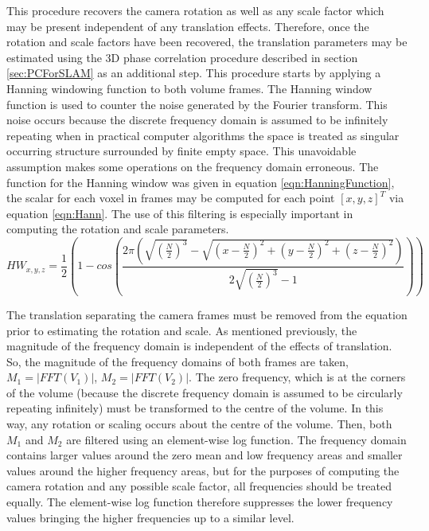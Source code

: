 This procedure recovers the camera rotation as well as any scale factor which may be present independent of any translation effects. Therefore, once the rotation and scale factors have been recovered, the translation parameters may be estimated using the 3D phase correlation procedure described in section \ref{sec:PCForSLAM} as an additional step. This procedure starts by applying a Hanning windowing function to both volume frames. The Hanning window function is used to counter the noise generated by the Fourier transform. This noise occurs because the discrete frequency domain is assumed to be infinitely repeating when in practical computer algorithms the space is treated as singular occurring structure surrounded by finite empty space. This unavoidable assumption makes some operations on the frequency domain erroneous. The function for the Hanning window was given in equation \ref{eqn:HanningFunction}, the scalar for each voxel in frames may be computed for each point $[x,y,z]^T$ via equation \ref{eqn:Hann}. The use of this filtering is especially important in computing the rotation and scale parameters. \\


\begin{equation} \label{eqn:Hann}
\scriptstyle
HW_{x,y,z} = \frac{1}{2}\left(
1 - cos \left(
\frac{2\pi
\left(
\sqrt{\left(\frac{N}{2}\right)^3} -
\sqrt{
\left(x-\frac{N}{2}\right)^2 + \left(y-\frac{N}{2}\right)^2 + \left(z-\frac{N}{2}\right)^2
}
\right)
}
{2\sqrt{\left(\frac{N}{2}\right)^3} - 1}
\right)
\right)
\end{equation}

The translation separating the camera frames must be removed from the equation prior to estimating the rotation and scale. As mentioned previously, the magnitude of the frequency domain is independent of the effects of translation. So, the magnitude of the frequency domains of both frames are taken, $M_1 = |FFT(V_1)|$, $M_2 = |FFT(V_2)|$. The zero frequency, which is at the corners of the volume (because the discrete frequency domain is assumed to be circularly repeating infinitely) must be transformed to the centre of the volume. In this way, any rotation or scaling occurs about the centre of the volume. Then, both $M_1$ and $M_2$ are filtered using an element-wise log function. The frequency domain contains larger values around the zero mean and low frequency areas and smaller values around the higher frequency areas, but for the purposes of computing the camera rotation and any possible scale factor, all frequencies should be treated equally. The element-wise log function therefore suppresses the lower frequency values bringing the higher frequencies up to a similar level. \\

